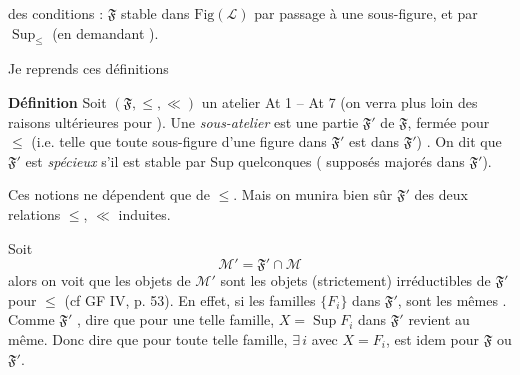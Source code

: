 \documentclass[11pt,a4paper]{article}
\begin{document}


des conditions : $\mathfrak{F}$ stable dans $\mathrm{Fig}(\mathcal{L})$ par passage à une sous-figure, et par $\operatorname{Sup}_{\leq}$ (en demandant \ill{} \ill{}).

Je reprends ces définitions

\textbf{Définition} Soit $(\mathfrak{F}, \leq, \ll)$ un atelier At 1 -- At 7 (on verra plus loin des raisons ultérieures pour \ill{}). Une \emph{sous-atelier} \struck{(\ill{})} est une partie  $\mathfrak{F}'$ de $\mathfrak{F}$, fermée pour $\leq$ (i.e. telle que toute sous-figure d'une figure dans $\mathfrak{F}'$ est dans $\mathfrak{F}'$) . On dit que $\mathfrak{F}'$ est \emph{spécieux}  s'il est stable par Sup quelconques (\ill{} supposés majorés dans $\mathfrak{F}'$).


Ces notions \struck{\ill{}} ne dépendent que de $\leq$. Mais on munira bien sûr $\mathfrak{F}'$ des deux relations $\leq$, $\ll$ induites.

Soit
\[
  \mathcal{M}' = \mathfrak{F}' \cap \mathcal{M}
\]
alors on voit que les objets de $\mathcal{M}'$ sont les objets (strictement) irréductibles de $\mathfrak{F}'$ pour $\leq$ (cf GF IV, p. 53). En effet, si      les familles $\lbrace F_i \rbrace$ dans $\mathfrak{F}'$,  sont les mêmes \struck{\ill{}}. Comme $\mathfrak{F}'$ , dire que pour une telle famille, $X = \operatorname{Sup} F_i$ dans $\mathfrak{F}'$ revient au même. Donc dire que pour \struck{\ill{}} toute telle famille, $\exists\, i$ avec $X = F_i$, est idem pour $\mathfrak{F}$ ou $\mathfrak{F}'$.
\end{document}
